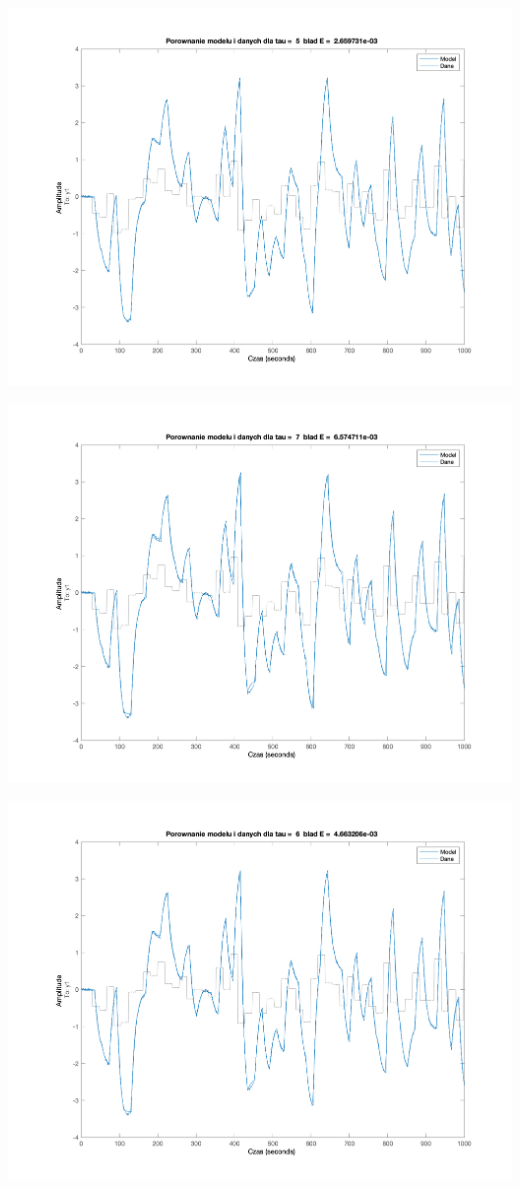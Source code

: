 \documentclass[a4paper, 11pt]{article}
\begin{document}
\begin{enumerate}
 \includegraphics[width=\linewidth]{./ModelsP1/modelTau5.png} 
 
 \includegraphics[width=\linewidth]{./ModelsP1/modelTau7.png} 
 
 \includegraphics[width=\linewidth]{./ModelsP1/modelTau6.png} 
 

\end{enumerate}
\end{document}
